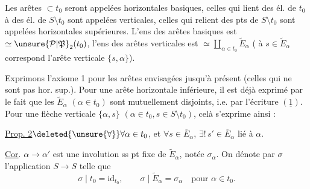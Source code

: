 Les arêtes $\subset t_0$ seront appelées horizontales basiques, celles qui lient des él. de $t_0$ à des él. de $S\setminus t_0$ sont appelées verticales, celles qui relient des pts de $S\setminus t_0$ sont appelées horizontales supérieures.  L'ens des  arêtes basiques est $\simeq\unsure{\mathcal P|\mathfrak P}_2(t_0)$, l'ens des arêtes verticales est $\simeq\coprod_{\alpha\in t_0}\widetilde E_\alpha$ ( à $s\in\widetilde E_\alpha$ correspond l'arête verticale $\{s,\alpha\}$).

Exprimons l'axiome 1 pour les arêtes envisagées jusqu'à présent (celles qui ne sont pas hor. sup.). Pour une arête horizontale inférieure, il est déjà exprimé par le fait que les $\widetilde E_\alpha$ $(\alpha\in t_0)$ sont mutuellement disjoints, i.e. par l'écriture $(\underline{1})$. Pour une flèche verticale $\{\alpha,s\}$ $(\alpha\in t_0,s\in S\setminus t_0)$, celà s'exprime ainsi :

\noindent\vrule\hspace{.5em}\begin{minipage}{.89\linewidth}\uline{Prop. 2}\quad $\deleted{\unsure{\forall}}\forall\alpha\in t_0$, et $\forall s\in\overline E_\alpha$, $\exists!\,s'\in\overline E_\alpha$ lié à $\alpha$.\end{minipage}

\noindent\vrule\hspace{.5em}\begin{minipage}{.89\linewidth}\uline{Cor}. \quad $\alpha\longrightarrow\alpha'$ est une involution ss pt fixe de $\widetilde E_\alpha$, notée $\sigma_\alpha$. On dénote par $\sigma$ l'application $S\longrightarrow S$ telle que
\[
\sigma\mid t_0=\mathrm{id}_{t_0},\qquad
\sigma\mid\widetilde E_\alpha=\sigma_\alpha\quad\text{pour }\alpha\in t_0.
\]
\end{minipage}
